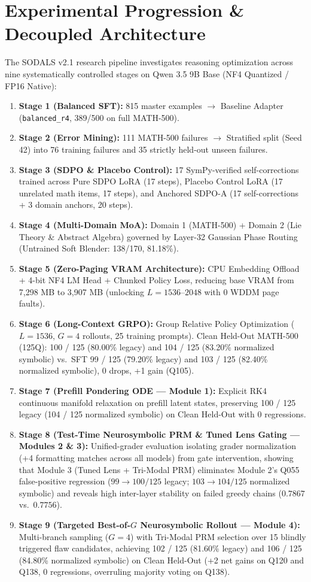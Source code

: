 \documentclass[11pt,a4paper]{article}
\begin{document}
\section{Experimental Progression \& Decoupled Architecture}

The SODALS v2.1 research pipeline investigates reasoning optimization across nine systematically controlled stages on Qwen 3.5 9B Base (NF4 Quantized / FP16 Native):
\begin{enumerate}
    \item \textbf{Stage 1 (Balanced SFT):} 815 master examples $\to$ Baseline Adapter (\texttt{balanced\_r4}, 389/500 on full MATH-500).
    \item \textbf{Stage 2 (Error Mining):} 111 MATH-500 failures $\to$ Stratified split (Seed 42) into 76 training failures and 35 strictly held-out unseen failures.
    \item \textbf{Stage 3 (SDPO \& Placebo Control):} 17 SymPy-verified self-corrections trained across Pure SDPO LoRA (17 steps), Placebo Control LoRA (17 unrelated math items, 17 steps), and Anchored SDPO-A (17 self-corrections + 3 domain anchors, 20 steps).
    \item \textbf{Stage 4 (Multi-Domain MoA):} Domain 1 (MATH-500) + Domain 2 (Lie Theory \& Abstract Algebra) governed by Layer-32 Gaussian Phase Routing (Untrained Soft Blender: 138/170, 81.18\%).
    \item \textbf{Stage 5 (Zero-Paging VRAM Architecture):} CPU Embedding Offload + 4-bit NF4 LM Head + Chunked Policy Loss, reducing base VRAM from 7,298 MB to 3,907 MB (unlocking $L=1536\text{--}2048$ with 0 WDDM page faults).
    \item \textbf{Stage 6 (Long-Context GRPO):} Group Relative Policy Optimization ($L=1536$, $G=4$ rollouts, 25 training prompts). Clean Held-Out MATH-500 (125Q): 100 / 125 (80.00\% legacy) and 104 / 125 (83.20\% normalized symbolic) vs.\ SFT 99 / 125 (79.20\% legacy) and 103 / 125 (82.40\% normalized symbolic), 0 drops, +1 gain (Q105).
    \item \textbf{Stage 7 (Prefill Pondering ODE --- Module 1):} Explicit RK4 continuous manifold relaxation on prefill latent states, preserving 100 / 125 legacy (104 / 125 normalized symbolic) on Clean Held-Out with 0 regressions.
    \item \textbf{Stage 8 (Test-Time Neurosymbolic PRM \& Tuned Lens Gating --- Modules 2 \& 3):} Unified-grader evaluation isolating grader normalization (+4 formatting matches across all models) from gate intervention, showing that Module 3 (Tuned Lens + Tri-Modal PRM) eliminates Module 2's Q055 false-positive regression ($99 \to 100/125$ legacy; $103 \to 104/125$ normalized symbolic) and reveals high inter-layer stability on failed greedy chains ($0.7867$ vs.\ $0.7756$).
    \item \textbf{Stage 9 (Targeted Best-of-$G$ Neurosymbolic Rollout --- Module 4):} Multi-branch sampling ($G=4$) with Tri-Modal PRM selection over 15 blindly triggered flaw candidates, achieving 102 / 125 (81.60\% legacy) and 106 / 125 (84.80\% normalized symbolic) on Clean Held-Out (+2 net gains on Q120 and Q138, 0 regressions, overruling majority voting on Q138).
\end{enumerate}
\end{document}
